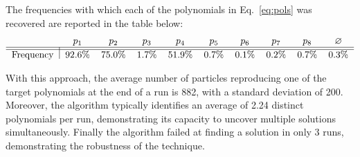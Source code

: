 \documentclass[11pt]{article}
\begin{document}
The frequencies with which each of the polynomials in Eq.~\eqref{eq:pols} was recovered are reported in the table below:
  \begin{equation}
  	\label{table:results}
	\begin{tabular}{l|ccccccccc}
		& $p_{1}$ & $p_{2}$ & $p_{3}$ & $p_{4}$ & $p_{5}$ & $p_{6}$ & $p_{7}$ & $p_{8}$ &  $\varnothing$  \\\hline\hline
		Frequency & 92.6\% & 75.0\% & 1.7\% & 51.9\% & 0.7\% & 0.1\% & 0.2\% & 0.7\% & 0.3\%
	\end{tabular}
\end{equation}

With this approach, the average number of particles reproducing one of the target polynomials at the end of a run is 882, with a standard deviation of 200. Moreover, the algorithm typically identifies an average of 2.24 distinct polynomials per run, demonstrating its capacity to uncover multiple solutions simultaneously. Finally the algorithm failed at finding a solution in only 3 runs, demonstrating the robustness of the technique. 
\end{document}

